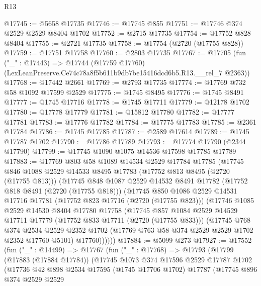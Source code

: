 \begin{lexlean}{R13}
\begin{coremodule}
@17745 := @5658 @17735
@17746 := @17745 @855
@17751 := @17746 @374 @2529 @2529 @8404 @1702
@17752 := @2715 @17735
@17754 := @17752 @828 @8404
@17755 := @2721 @17735
@17758 := @17754 (@2720 (@17755 @828))
@17759 := @17751 @17758
@17760 := @2803 @17735
@17767 := @17705
    (fun ("_" : @17443) =>
    @17744 (@17759 @17760) (LexLeanPreserve.Ce74c78a8f5b611b9db7be15416dcd6b5.R13.__rel_7 @2363))
@17768 := @17442 @2661
@17769 := @2793 @17735
@17774 := @17769 @732 @58 @1092 @17599 @2529
@17775 := @1745 @8495
@17776 := @1745 @8491
@17777 := @1745 @17716
@17778 := @1745 @17711
@17779 := @12178 @1702
@17780 := @17778 @17779
@17781 := @15812 @17780
@17782 := @17777 @17781
@17783 := @17776 @17782
@17784 := @17775 @17783
@17785 := @2361 @17784
@17786 := @1745 @17785
@17787 := @2589 @17614
@17789 := @1745 @17787 @1702
@17790 := @17786 @17789
@17793 := @17774 @17790 (@2344 @17790)
@17799 := @17745 @1090 @1075 @14536 @17598 @17785 @17789
@17883 := @17769
    @803
    @58
    @1089
    @14534
    @2529
    @17784
    @17785
    (@17745
      @846
      @1088
      @2529
      @14533
      @8495
      @17783
      (@17752 @813 @8495 (@2720 (@17755 @813)))
      (@17745
        @848
        @1087
        @2529
        @14532
        @8491
        @17782
        (@17752 @818 @8491 (@2720 (@17755 @818)))
        (@17745
          @850
          @1086
          @2529
          @14531
          @17716
          @17781
          (@17752 @823 @17716 (@2720 (@17755 @823)))
          (@17746
            @1085
            @2529
            @14530
            @8404
            @17780
            @17758
            (@17745
              @857
              @1084
              @2529
              @14529
              @17711
              @17779
              (@17752 @833 @17711 (@2720 (@17755 @833)))
              (@17745
                @768
                @374
                @2534
                @2529
                @2352
                @1702
                (@17769 @763 @58 @374 @2529 @2529 @1702 @2352 @17760 @5101)
                @17760))))))
@17884 := @5099 @273
@17927 := @17552
    (fun ("_" : @14499) =>
    @17767
      (fun ("_" : @17768) =>
      @17793
        (@17799
          (@17883 (@17884 @17784))
          (@17745
            @1073
            @374
            @17596
            @2529
            @17787
            @1702
            (@17736
              @42
              @898
              @2534
              @17595
              (@1745 @17706 @1702)
              @17787
              (@17745
                @896
                @374
                @2529
                @2529

\end{coremodule}
\end{lexlean}
